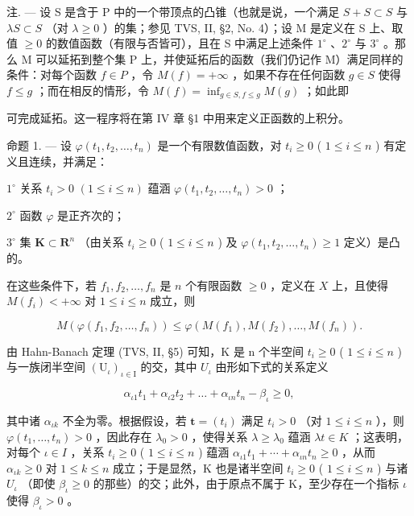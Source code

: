 注. --- 设 S 是含于 P 中的一个带顶点的凸锥（也就是说，一个满足 \(S + S \subset S\) 与 \(\lambda S \subset S\) （对 \(\lambda \geqslant 0\) ）的集；参见 TVS, II, §2, No. 4）；设 M 是定义在 S 上、取值 \(\geqslant 0\) 的数值函数（有限与否皆可），且在 S 中满足上述条件 \(1^{\circ}\) 、\(2^{\circ}\) 与 \(3^{\circ}\) 。那么 M 可以延拓到整个集 P 上，并使延拓后的函数（我们仍记作 M）满足同样的条件：对每个函数 \(f \in P\) ，令 \(M(f) = +\infty\) ，如果不存在任何函数 \(g \in S\) 使得 \(f \leqslant g\) ；而在相反的情形，令 \(M(f) = \inf_{g \in S, f \leqslant g} M(g)\) ；如此即

可完成延拓。这一程序将在第 IV 章 §1 中用来定义正函数的上积分。

命题 1. --- 设 \(\varphi(t_{1}, t_{2}, \ldots, t_{n})\) 是一个有限数值函数，对 \(t_{i} \geqslant 0\) ( \(1 \leqslant i \leqslant n\) ) 有定义且连续，并满足：

\(1^{\circ}\) 关系 \(t_i > 0\) \((1\leqslant i\leqslant n)\) 蕴涵 \(\varphi (t_1,t_2,\dots ,t_n) > 0\) ；

\(2^{\circ}\) 函数 \(\varphi\) 是正齐次的；

\(3^{\circ}\) 集 \(\mathbf{K} \subset \mathbf{R}^{n}\) （由关系 \(t_{i} \geqslant 0\) ( \(1 \leqslant i \leqslant n\) ) 及 \(\varphi(t_{1}, t_{2}, \ldots, t_{n}) \geqslant 1\) 定义）是凸的。

在这些条件下，若 \(f_1, f_2, \ldots, f_n\) 是 \(n\) 个有限函数 \(\geqslant 0\) ，定义在 \(X\) 上，且使得 \(M(f_i) < +\infty\) 对 \(1 \leqslant i \leqslant n\) 成立，则

\[
M \left(\varphi \left(f _ {1}, f _ {2}, \dots , f _ {n}\right)\right) \leqslant \varphi \left(M \left(f _ {1}\right), M \left(f _ {2}\right), \dots , M \left(f _ {n}\right)\right).\tag{1}
\]

由 Hahn-Banach 定理 (TVS, II, §5) 可知，K 是 n 个半空间 \(t_{i} \geqslant 0\) ( \(1 \leqslant i \leqslant n\) ) 与一族闭半空间 \((\mathrm{U}_{\iota})_{\iota \in \mathrm{I}}\) 的交，其中 \(U_{\iota}\) 由形如下式的关系定义

\[
\alpha_ {\iota 1} t _ {1} + \alpha_ {\iota 2} t _ {2} + \dots + \alpha_ {\iota n} t _ {n} - \beta_ {\iota} \geqslant 0,\tag{2}
\]

其中诸 \(\alpha_{\iota k}\) 不全为零。根据假设，若 \(\mathbf{t}=(t_{i})\) 满足 \(t_{i}>0\) （对 \(1\leqslant i\leqslant n\) ），则 \(\varphi(t_{1},\ldots,t_{n})>0\) ，因此存在 \(\lambda_{0}>0\) ，使得关系 \(\lambda\geqslant\lambda_{0}\) 蕴涵 \(\lambda t\in K\) ；这表明，对每个 \(\iota\in I\) ，关系 \(t_{i}\geqslant0\) ( \(1\leqslant i\leqslant n\) ) 蕴涵 \(\alpha_{\iota1}t_{1}+\cdots+\alpha_{\iota n}t_{n}\geqslant0\) ，从而 \(\alpha_{\iota k}\geqslant0\) 对 \(1\leqslant k\leqslant n\) 成立；于是显然，K 也是诸半空间 \(t_{i}\geqslant0\) ( \(1\leqslant i\leqslant n\) ) 与诸 \(U_{\iota}\) （即使 \(\beta_{\iota}\geqslant0\) 的那些）的交；此外，由于原点不属于 K，至少存在一个指标 \(\iota\) 使得 \(\beta_{\iota}>0\) 。

